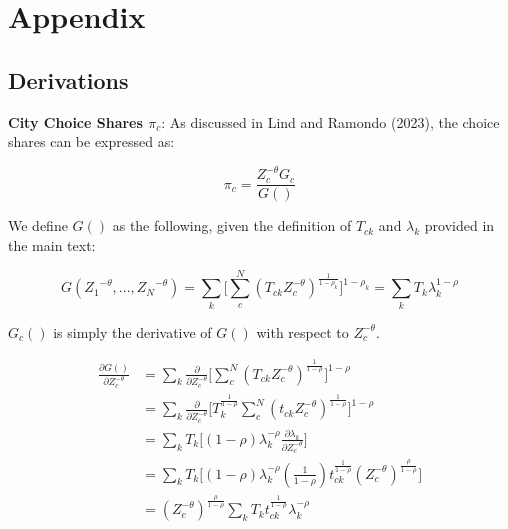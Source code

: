 \documentclass[10pt]{article}
\begin{document}
\newpage


\newpage

\section{Appendix}

\subsection{Derivations}

\noindent\textbf{City Choice Shares $\pi_{c}$}: As discussed in Lind and Ramondo (2023), the choice shares can be expressed as:

\begin{equation*}
    \pi_{c}=\frac{Z_{c}^{-\theta}{G_{c}}}{G()}
\end{equation*}

We define $G()$ as the following, given the definition of $T_{ck}$ and $\lambda_{k}$ provided in the main text:

\begin{equation*}
    G({Z_{1}}^{-\theta},...,{Z_{N}}^{-\theta})=\sum\limits_{k}\Big[\sum\limits_{c}^{N}({T_{ck}}{Z_{c}^{-\theta}})^{\frac{1}{1-\rho_{k}}}\Big]^{1-\rho_{k}} = \sum\limits_{k}{T_{k}}\lambda^{1-\rho}_{k}
\end{equation*}

$G_{c}()$ is simply the derivative of $G()$ with respect to $Z_{c}^{-\theta}$.

\begin{align*}
    \frac{\partial{G()}}{\partial{Z_{c}^{-\theta}}} & = \sum\limits_{k}\frac{\partial}{\partial{Z_{c}^{-\theta}}}\Big[\sum\limits_{c}^{N}({T_{ck}}{Z_{c}^{-\theta}})^{\frac{1}{1-\rho}}\Big]^{1-\rho} \\ &= \sum\limits_{k}\frac{\partial}{\partial{Z_{c}^{-\theta}}}\Big[{T^{\frac{1}{1-\rho}}_{k}}\sum\limits_{c}^{N}({t_{ck}}{Z_{c}^{-\theta}})^{\frac{1}{1-\rho}}\Big]^{1-\rho} \\ &= \sum\limits_{k}{T_{k}}\Big[(1-\rho)\lambda^{-\rho}_{k}\frac{\partial{\lambda_{k}}}{\partial{Z_{c}^{-\theta}}}\Big] \\ &= \sum\limits_{k}{T_{k}}\Big[(1-\rho)\lambda^{-\rho}_{k}(\frac{1}{1-\rho}){t^{\frac{1}{1-\rho}}_{ck}}(Z_{c}^{-\theta})^{\frac{\rho}{1-\rho}}\Big]\\ &= (Z_{c}^{-\theta})^{\frac{\rho}{1-\rho}}\sum\limits_{k}{T_{k}}{t^{\frac{1}{1-\rho}}_{ck}}\lambda_{k}^{-\rho}
\end{align*}
\end{document}
